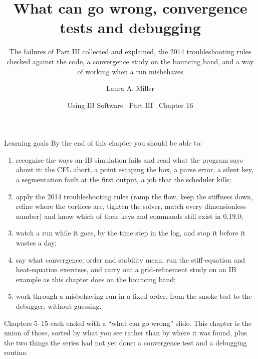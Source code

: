 \documentclass[aspectratio=169,11pt]{beamer}
\title[What can go wrong]{What can go wrong, convergence tests and debugging}
\subtitle{The failures of Part III collected and explained, the 2014 troubleshooting rules checked against the code, a convergence study on the bouncing band, and a way of working when a run misbehaves}
\author[Miller]{Laura A. Miller}
\institute[UArizona]{Department of Mathematics, University of Arizona}
\date{Using IB Software \textbullet\ Part III \textbullet\ Chapter 16}
\begin{document}
\begin{frame}[plain]
\end{frame}

\begin{frame}{Learning goals}
\label{fr:goals}
\footnotesize By the end of this chapter you should be able to:
\begin{enumerate}
  \item recognise the ways an IB simulation fails and read what the program says about it: the CFL abort, a point escaping the box, a parse error, a silent key, a segmentation fault at the first output, a job that the scheduler kills;
  \item apply the 2014 troubleshooting rules (ramp the flow, keep the stiffness down, refine where the vortices are, tighten the solver, match every dimensionless number) and know which of their keys and commands still exist in 0.19.0;
  \item watch a run while it goes, by the time step in the log, and stop it before it wastes a day;
  \item say what convergence, order and stability mean, run the stiff-equation and heat-equation exercises, and carry out a grid-refinement study on an IB example as this chapter does on the bouncing band;
  \item work through a misbehaving run in a fixed order, from the smoke test to the debugger, without guessing.
\end{enumerate}
\begin{punchbox}
\footnotesize Chapters 5--15 each ended with a ``what can go wrong'' slide. This chapter is the union of those, sorted by what you see rather than by where it was found, plus the two things the series had not yet done: a convergence test and a debugging routine.
\end{punchbox}
\end{frame}
\end{document}
